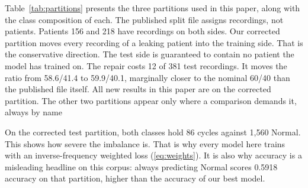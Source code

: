 \documentclass[journal,onecolumn]{IEEEtran}
\begin{document}
Table~\ref{tab:partitions} presents the three partitions used in this paper, along with the class composition of each. The published split file assigns recordings, not patients. Patients 156 and 218 have recordings on both sides. Our corrected partition moves every recording of a leaking patient into the training side. That is the conservative direction. The test side is guaranteed to contain no patient the model has trained on. The repair costs 12 of 381 test recordings. It moves the ratio from 58.6/41.4 to 59.9/40.1, marginally closer to the nominal 60/40 than the published file itself. All new results in this paper are on the corrected partition. The other two partitions appear only where a comparison demands it, always by name

On the corrected test partition, both classes hold 86 cycles against 1,560 Normal. This shows how severe the imbalance is. That is why every model here trains with an inverse-frequency weighted loss (\ref{eq:weights}). It is also why accuracy is a misleading headline on this corpus: always predicting Normal scores 0.5918 accuracy on that partition, higher than the accuracy of our best model.
\end{document}
